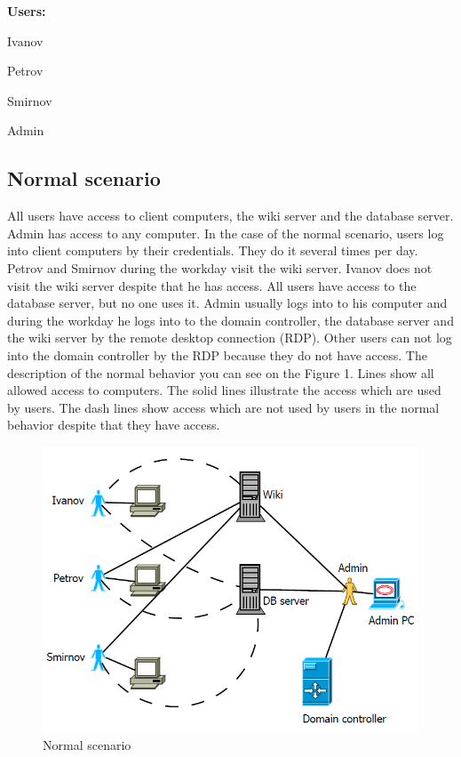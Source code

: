\begin{compactitem}
\item [\textbf{Users:}]
\item Ivanov
\item Petrov
\item Smirnov
\item Admin
\end{compactitem}
     
\subsection{Normal scenario}
All users have access to client computers, the wiki server and the database server. Admin has access to any computer. In the case of the normal scenario, users log into client computers by their credentials. They do it several times per day. Petrov and Smirnov during the workday visit the wiki server. Ivanov does not visit the wiki server despite that he has access. All users have access to the database server, but no one uses it. Admin usually logs into to his computer and during the workday he logs into to the domain controller, the database server and the wiki server by the remote desktop connection (RDP). Other users can not log into the domain controller by the RDP because they do not have access. The description of the normal behavior you can see on the Figure 1. Lines show all allowed access to computers. The solid lines illustrate the access which are used by users. The dash lines show access which are not used by users in the normal behavior despite that they have access. 
\begin{figure}[ht!]
\centering
\includegraphics[width=\textwidth]{scenario_normal.png}
\caption{Normal scenario}
\label{overflow}
\end{figure}

